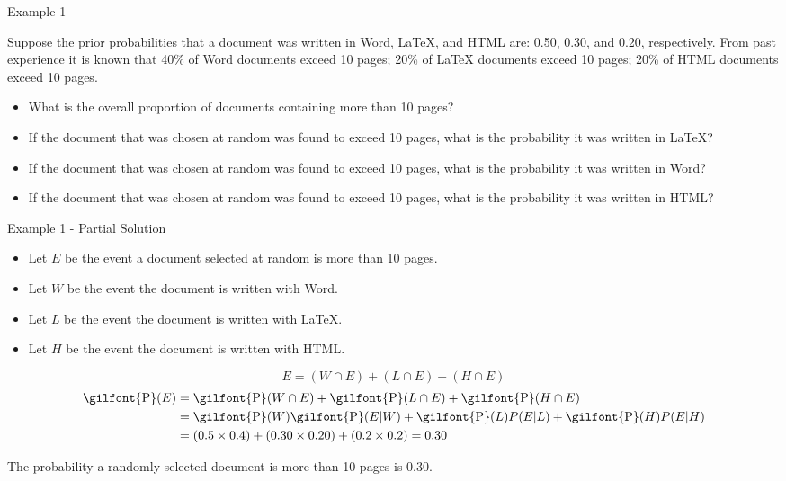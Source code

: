 \documentclass[
  ignorenonframetext,
]{beamer}
\begin{document}
\begin{frame}{Example 1}
\label{example-1-1}
\begin{tcolorbox}
Suppose the prior probabilities that a document was written in Word, LaTeX, and HTML are: 0.50, 0.30, and 0.20, respectively.  From past experience it is known that 40\% of Word documents exceed 10 pages; 20\% of LaTeX documents exceed 10 pages; 20\% of HTML documents exceed 10 pages.  

\begin{itemize}
\item What is the overall proportion of documents containing more than 10 pages?
\item If the document that was chosen at random was found to exceed 10 pages, what is the probability it was written in LaTeX?
\item If the document that was chosen at random was found to exceed 10 pages, what is the probability it was written in Word?
\item If the document that was chosen at random was found to exceed 10 pages, what is the probability it was written in HTML?
\end{itemize}

\end{tcolorbox}
\end{frame}

\begin{frame}{Example 1 - Partial Solution}
\label{example-1---partial-solution}
\begin{itemize}
\item Let $E$ be the event a document selected at random is more than 10 pages.
\item Let $W$ be the event the document is written with Word.
\item Let $L$ be the event the document is written with LaTeX.
\item Let $H$ be the event the document is written with HTML.
\end{itemize}

\[E = (W \cap E) + (L \cap E) + (H \cap E)\] \[
\begin{aligned}
\textrm{\gilfont{P}}\normalfont (E) &= \textrm{\gilfont{P}}\normalfont (W \cap E) + \textrm{\gilfont{P}}\normalfont (L \cap E) + \textrm{\gilfont{P}}\normalfont (H \cap E)\\
&= \textrm{\gilfont{P}}\normalfont (W)\textrm{\gilfont{P}}\normalfont (E|W) + \textrm{\gilfont{P}}\normalfont (L)P(E|L) + \textrm{\gilfont{P}}\normalfont (H)P(E|H)\\
&=(0.5 \times 0.4) + (0.30 \times 0.20) + (0.2 \times 0.2) = 0.30
\end{aligned}
\]

\begin{tcolorbox}
The probability a randomly selected document is more than 10 pages is 0.30.
\end{tcolorbox}
\end{frame}
\end{document}
